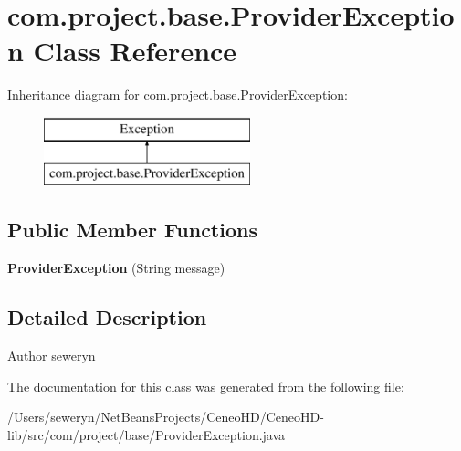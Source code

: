 \section{com.\+project.\+base.\+Provider\+Exception Class Reference}
\label{classcom_1_1project_1_1base_1_1_provider_exception}
Inheritance diagram for com.\+project.\+base.\+Provider\+Exception\+:\begin{figure}[H]
\begin{center}
\leavevmode
\includegraphics[height=2.000000cm]{classcom_1_1project_1_1base_1_1_provider_exception}
\end{center}
\end{figure}
\subsection*{Public Member Functions}
\begin{DoxyCompactItemize}
\item 
\mbox{\label{classcom_1_1project_1_1base_1_1_provider_exception_ae9596b49f78bb1f132a797e3e11c8748}} 
{\bfseries Provider\+Exception} (String message)
\end{DoxyCompactItemize}


\subsection{Detailed Description}
\begin{DoxyAuthor}{Author}
seweryn 
\end{DoxyAuthor}


The documentation for this class was generated from the following file\+:\begin{DoxyCompactItemize}
\item 
/\+Users/seweryn/\+Net\+Beans\+Projects/\+Ceneo\+H\+D/\+Ceneo\+H\+D-\/lib/src/com/project/base/Provider\+Exception.\+java\end{DoxyCompactItemize}
